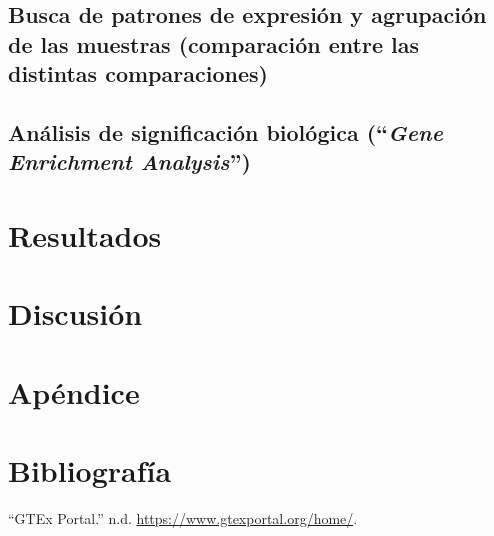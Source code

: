 \documentclass[
  english,
]{article}
\begin{document}
\hypertarget{busca-de-patrones-de-expresiuxf3n-y-agrupaciuxf3n-de-las-muestras-comparaciuxf3n-entre-las-distintas-comparaciones}{%
\subsection{Busca de patrones de expresión y agrupación de las muestras
(comparación entre las distintas
comparaciones)}\label{busca-de-patrones-de-expresiuxf3n-y-agrupaciuxf3n-de-las-muestras-comparaciuxf3n-entre-las-distintas-comparaciones}}

\hypertarget{anuxe1lisis-de-significaciuxf3n-bioluxf3gica-gene-enrichment-analysis}{%
\subsection{\texorpdfstring{Análisis de significación biológica
(``\emph{Gene Enrichment
Analysis}'')}{Análisis de significación biológica (``Gene Enrichment Analysis'')}}\label{anuxe1lisis-de-significaciuxf3n-bioluxf3gica-gene-enrichment-analysis}}

\hypertarget{resultados}{%
\section{Resultados}\label{resultados}}

\hypertarget{discusiuxf3n}{%
\section{Discusión}\label{discusiuxf3n}}

\hypertarget{apuxe9ndice}{%
\section{Apéndice}\label{apuxe9ndice}}

\hypertarget{bibliografuxeda}{%
\section*{Bibliografía}\label{bibliografuxeda}}

\hypertarget{refs}{}
\leavevmode\hypertarget{ref-GTEx}{}%
``GTEx Portal.'' n.d. \url{https://www.gtexportal.org/home/}.
\end{document}
